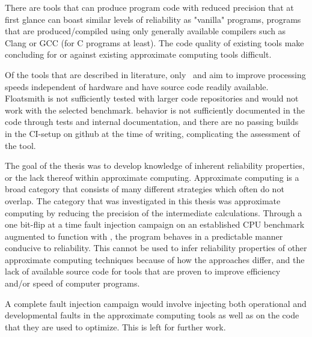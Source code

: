
There are tools that can produce program code with reduced precision that at first glance can boast similar levels of reliability as "vanilla" programs, programs that are produced/compiled using only generally available compilers such as Clang or GCC (for C programs at least). 
The code quality of existing tools make concluding for or against existing approximate computing tools difficult. 

Of the tools that are described in literature, only \floatsmith\ and \taffo{} aim to improve processing speeds independent of hardware and have source code readily available. Floatsmith is not sufficiently tested with larger code repositories and would not work with the selected benchmark. \taffo{} behavior is not sufficiently documented in the code through tests and internal documentation, and there are no passing builds in the CI-setup on github at the time of writing, complicating the assessment of the tool.

The goal of the thesis was to develop knowledge of inherent reliability properties, or the lack thereof within approximate computing. Approximate computing is a broad category that consists of many different strategies which often do not overlap. The category that was investigated in this thesis was approximate computing by reducing the precision of the intermediate calculations. Through a one bit-flip at a time fault injection campaign on an established CPU benchmark augmented to function with \taffo{}, the program behaves in a predictable manner conducive to reliability. This cannot be used to infer reliability properties of other approximate computing techniques because of how the approaches differ, and the lack of available source code for  tools that are proven to improve efficiency and/or speed of computer programs. 

A complete fault injection campaign would involve injecting both operational and developmental faults in the approximate computing tools as well as on the code that they are used to optimize. This is left for further work. 
